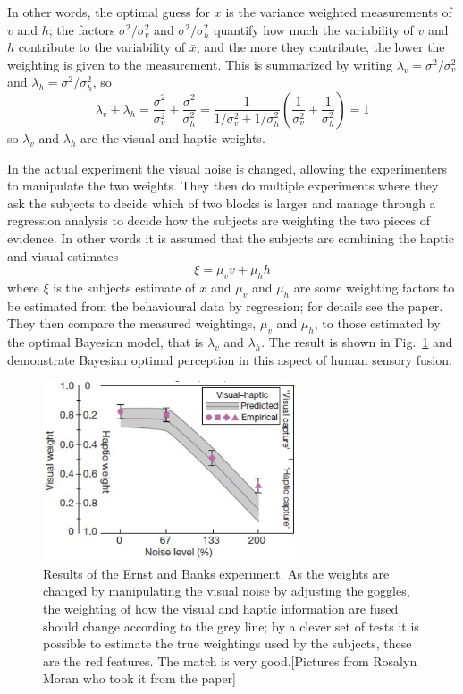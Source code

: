 \documentclass[12pt]{article}
\begin{document}
In other words, the optimal guess for $x$ is the variance weighted
measurements of $v$ and $h$; the factors $\sigma^2/\sigma_v^2$ and
$\sigma^2/\sigma_h^2$ quantify how much the variability of $v$ and $h$
contribute to the variability of $\bar{x}$, and the more they
contribute, the lower the weighting is given to the measurement. This
is summarized by writing $\lambda_v=\sigma^2/\sigma_v^2$ and
$\lambda_h=\sigma^2/\sigma_h^2$, so
\begin{equation}
\lambda_v+\lambda_h=\frac{\sigma^2}{\sigma_v^2}+\frac{\sigma^2}{\sigma_h^2}=\frac{1}{1/\sigma_v^2+1/\sigma_h^2}\left(\frac{1}{\sigma_v^2}+\frac{1}{\sigma_h^2}\right)=1
\end{equation}
so $\lambda_v$ and $\lambda_h$ are the visual and haptic weights.

In the actual experiment the visual noise is changed, allowing the
experimenters to manipulate the two weights. They then do multiple
experiments where they ask the subjects to decide which of two blocks
is larger and manage through a regression analysis to decide how the
subjects are weighting the two pieces of evidence. In other words it is assumed that the subjects are combining the haptic and visual estimates
\begin{equation}
\xi=\mu_v v+\mu_h h
\end{equation}
where $\xi$ is the subjects estimate of $x$ and $\mu_v$ and $\mu_h$
are some weighting factors to be estimated from the behavioural data
by regression; for details see the paper. They then compare the
measured weightings, $\mu_v$ and $\mu_h$, to those estimated by the
optimal Bayesian model, that is $\lambda_v$ and $\lambda_h$. The
result is shown in Fig.~\ref{fig_weights} and demonstrate Bayesian
optimal perception in this aspect of human sensory fusion.


\begin{figure}[htb]
\begin{center}
\includegraphics[width=7.5cm]{fig_weights.png}
\end{center}
\caption{Results of the Ernst and Banks experiment. As the weights are
  changed by manipulating the visual noise by adjusting the goggles,
  the weighting of how the visual and haptic information are fused
  should change according to the grey line; by a clever set of tests
  it is possible to estimate the true weightings used by the subjects,
  these are the red features. The match is very good.[Pictures from
    Rosalyn Moran who took it from the paper]\label{fig_weights}}
\end{figure}


{}
\end{document}
